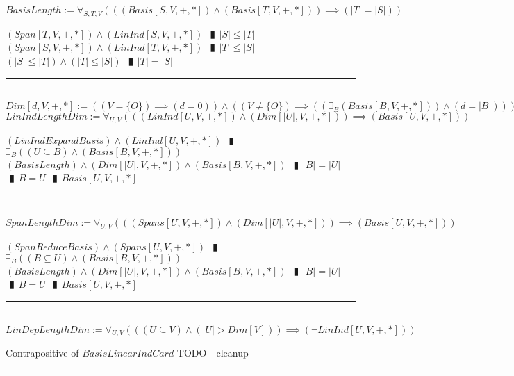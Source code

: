 \documentclass{book}
\newcommand{\abr}{:=}
\newcommand{\pipe}{$\phantom{(}\vrectangleblack\phantom{)}$}
\begin{document}
$BasisLength \abr \forall_{S, T, V}(((Basis[S, V, +, *]) \land (Basis[T, V, +, *])) \implies (|T| = |S|))$
\begin{enumerate}
  \lit $(Span[T, V, +, *]) \land (LinInd[S, V, +, *])$ \pipe $|S| \leq |T|$
  \lit $(Span[S, V, +, *]) \land (LinInd[T, V, +, *])$ \pipe $|T| \leq |S|$
  \lit $(|S| \leq |T|) \land (|T| \leq |S|)$ \pipe $|T| = |S|$
\end{enumerate} \vspace{.75mm} \hrule \vspace{.75mm} \ \\ 

$Dim[d, V, +, *] \abr ((V = \{O\}) \implies (d = 0)) \land  ((V \neq \{O\}) \implies ((\exists_{B}(Basis[B, V, +, *])) \land (d = |B|)))$ \\

$LinIndLengthDim \abr \forall_{U, V}(((LinInd[U, V, +, *]) \land (Dim[|U|, V, +, *])) \implies (Basis[U, V, +, *]))$
\begin{enumerate}
  \lit $(LinIndExpandBasis) \land (LinInd[U, V, +, *])$ \pipe $\exists_{B}((U \subseteq B) \land (Basis[B, V, +, *]))$
  \lit $(BasisLength) \land (Dim[|U|, V, +, *]) \land (Basis[B, V, +, *])$ \pipe $|B| = |U|$ \pipe $B = U$ \pipe $Basis[U, V, +, *]$
\end{enumerate} \vspace{.75mm} \hrule \vspace{.75mm} \ \\ 

$SpanLengthDim \abr \forall_{U, V}(((Spans[U, V, +, *]) \land (Dim[|U|, V, +, *])) \implies (Basis[U, V, +, *]))$
\begin{enumerate}
  \lit $(SpanReduceBasis) \land (Spans[U, V, +, *])$ \pipe $\exists_{B}((B \subseteq U) \land (Basis[B, V, +, *]))$
  \lit $(BasisLength) \land (Dim[|U|, V, +, *]) \land (Basis[B, V, +, *])$ \pipe $|B| = |U|$ \pipe $B = U$ \pipe $Basis[U, V, +, *]$
\end{enumerate} \vspace{.75mm} \hrule \vspace{.75mm} \ \\ 

$LinDepLengthDim \abr \forall_{U, V}(((U \subseteq V) \land (|U| > Dim[V])) \implies (\lnot LinInd[U, V, +, *]))$
\begin{enumerate}
  \lit Contrapositive of $BasisLinearIndCard$
  \lit TODO - cleanup
\end{enumerate} \vspace{.75mm} \hrule \vspace{.75mm} \ \\ 
\end{document}
